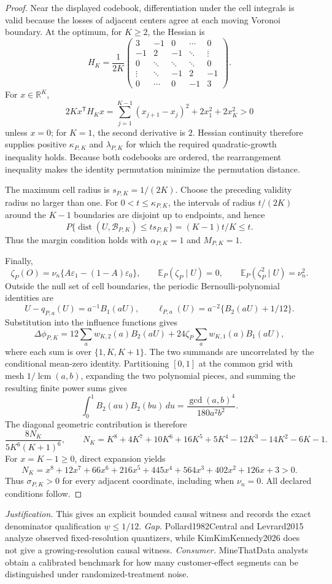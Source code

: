 \documentclass{article}
\begin{document}
\begin{proof}
Near the displayed codebook, differentiation under the cell integrals is valid because the losses of adjacent centers agree at each moving Voronoi boundary.  At the optimum, for \(K\geq2\), the Hessian is
\[
 H_K=\frac1{2K}
 \begin{pmatrix}
 3&-1&0&\cdots&0\\
 -1&2&-1&\ddots&\vdots\\
 0&\ddots&\ddots&\ddots&0\\
 \vdots&\ddots&-1&2&-1\\
 0&\cdots&0&-1&3
 \end{pmatrix}.
\]
For \(x\in\mathbb R^K\),
\[
 2Kx^{\mathsf T}H_Kx
 =\sum_{j=1}^{K-1}(x_{j+1}-x_j)^2+2x_1^2+2x_K^2>0
\]
unless \(x=0\); for \(K=1\), the second derivative is \(2\).  Hessian continuity therefore supplies positive \(\kappa_{P,K}\) and \(\lambda_{P,K}\) for which the required quadratic-growth inequality holds.  Because both codebooks are ordered, the rearrangement inequality makes the identity permutation minimize the permutation distance.

The maximum cell radius is \(s_{P,K}=1/(2K)\).  Choose the preceding validity radius no larger than one.  For \(0<t\leq\kappa_{P,K}\), the intervals of radius \(t/(2K)\) around the \(K-1\) boundaries are disjoint up to endpoints, and hence
\[
 P\{\operatorname{dist}(U,\mathcal B_{P,K})\leq ts_{P,K}\}
 =(K-1)t/K\leq t.
\]
Thus the margin condition holds with \(\alpha_{P,K}=1\) and \(M_{P,K}=1\).

Finally,
\[
 \zeta_P(O)=\nu_n\{A\varepsilon_1-(1-A)\varepsilon_0\},\qquad
 \mathbb E_P(\zeta_P\mid U)=0,\qquad
 \mathbb E_P(\zeta_P^2\mid U)=\nu_n^2.
\]
Outside the null set of cell boundaries, the periodic Bernoulli-polynomial identities are
\[
 U-q_{P,a}(U)=a^{-1}B_1(aU),\qquad
 \ell_{P,a}(U)=a^{-2}\{B_2(aU)+1/12\}.
\]
Substitution into the influence functions gives
\[
 \Delta\phi_{P,K}
 =12\sum_aw_{K,2}(a)B_2(aU)
 +24\zeta_P\sum_aw_{K,1}(a)B_1(aU),
\]
where each sum is over \(\{1,K,K+1\}\).  The two summands are uncorrelated by the conditional mean-zero identity.  Partitioning \([0,1]\) at the common grid with mesh \(1/\operatorname{lcm}(a,b)\), expanding the two polynomial pieces, and summing the resulting finite power sums gives
\[
 \int_0^1B_2(au)B_2(bu)\,du=\frac{\gcd(a,b)^4}{180a^2b^2}.
\]
The diagonal geometric contribution is therefore
\[
 \frac{8N_K}{5K^6(K+1)^6},\qquad
 N_K=K^8+4K^7+10K^6+16K^5+5K^4-12K^3-14K^2-6K-1.
\]
For \(x=K-1\geq0\), direct expansion yields
\[
 N_K=x^8+12x^7+66x^6+216x^5+445x^4+564x^3+402x^2+126x+3>0.
\]
Thus \(\sigma_{P,K}>0\) for every adjacent coordinate, including when \(\nu_n=0\).  All declared conditions follow.
\end{proof}
\par\smallskip\noindent \textit{Justification.} This gives an explicit bounded causal witness and records the exact denominator qualification \(\underline w\leq1/12\). \textit{Gap.} Pollard1982Central and Levrard2015 analyze observed fixed-resolution quantizers, while KimKimKennedy2026 does not give a growing-resolution causal witness. \textit{Consumer.} MineThatData analysts obtain a calibrated benchmark for how many customer-effect segments can be distinguished under randomized-treatment noise.
\end{document}
